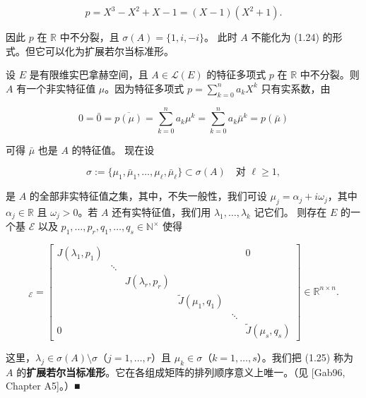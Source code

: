 \begin{remark}
\begin{items}
\[
p = X^{3} - X^{2} + X - 1 = (X - 1)(X^{2} + 1) .
\]

因此 $ p $ 在 $ \mathbb{R} $ 中不分裂，且 $ \sigma(A) = \{1, i, -i\} $。
此时 $ A $ 不能化为 (1.24) 的形式。但它可以化为扩展若尔当标准形。

\item

设 $ E $ 是有限维实巴拿赫空间，且 $ A \in \mathcal{L}(E) $ 的特征多项式 $ p $ 在 $ \mathbb{R} $ 中不分裂。则 $ A $ 有一个非实特征值 $ \mu $。因为特征多项式 $ p = \sum_{k=0}^{n}a_{k}X^{k} $ 只有实系数，由

\[
0 = \bar{0} = \overline{p(\mu)} = \sum_{k=0}^{n}a_{k}\mu^{k} = \sum_{k=0}^{n}a_{k}\bar{\mu}^{k} = p(\bar{\mu})
\]

可得 $ \bar{\mu} $ 也是 $ A $ 的特征值。
现在设

\[
\sigma := \{\mu_{1},\bar{\mu}_{1},\ldots,\mu_{\ell},\bar{\mu}_{\ell}\} \subset \sigma(A) \quad \text{对 } \ell \ge 1 ,
\]

是 $ A $ 的全部非实特征值之集，其中，不失一般性，我们可设 $ \mu_{j} = \alpha_{j} + i\omega_{j} $，其中 $ \alpha_{j} \in \mathbb{R} $ 且 $ \omega_{j} > 0 $。若 $ A $ 还有实特征值，我们用 $ \lambda_{1},\ldots,\lambda_{k} $ 记它们。
则存在 $ E $ 的一个基 $ \mathcal{E} $ 以及 $ p_{1},\ldots,p_{r},q_{1},\ldots,q_{s} \in \mathbb{N}^{\times} $ 使得

\begin{equation}
[A]_{\mathcal{E}} = \begin{bmatrix} J(\lambda_{1},p_{1}) & & & & & 0 \\ & \ddots & & & & \\ & & J(\lambda_{r},p_{r}) & & & \\ & & & \widetilde{J}(\mu_{1},q_{1}) & & \\ & & & & \ddots & \\ 0 & & & & & \widetilde{J}(\mu_{s},q_{s}) \end{bmatrix} \in \mathbb{R}^{n\times n} .\tag{1.25}
\end{equation}

这里，$ \lambda_{j} \in \sigma(A)\setminus\sigma $（$ j = 1,\ldots,r $）且 $ \mu_{k} \in \sigma $（$ k = 1,\ldots,s $）。我们把 (1.25) 称为 $ A $ 的\textbf{扩展若尔当标准形}。它在各组成矩阵的排列顺序意义上唯一。（见 [Gab96, Chapter A5]。）\nobreak\hspace{0.35em}■

\end{items}

\end{remark}

